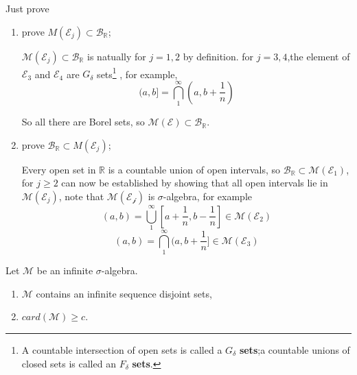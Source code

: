 \begin{mdframed}[backgroundcolor=gray!10,linewidth=0pt]
    \begin{pf} Just prove 
        \begin{enumerate}
            \item prove $M(\mathcal{E}_j)\subset \mathcal{B}_{\mathbb{R}}$;
            
            $\mathcal{M}(\mathcal{E}_j)\subset \mathcal{B}_{\mathbb{R}}$ is natually for $j=1,2$ by definition. for $j=3,4$,the element of $\mathcal{E}_3$ and $\mathcal{E}_4$ are $G_\delta$ sets\footnote{A countable intersection of open sets is called a $G_\delta$ \textbf{sets};a countable unions of closed sets is called an $F_\delta$ \textbf{sets}.}
            , for example, 
            \begin{equation}
                (a,b]=\bigcap^\infty_1(a,b+\frac{1}{n})
            \end{equation}

            So all there are Borel sets, so $\mathcal{\mathcal{M}(\mathcal{E})}\subset \mathcal{B}_{\mathbb{R}}$.

            \item prove $\mathcal{B}_{\mathbb{R}}\subset M(\mathcal{E}_j)$;
            
            Every open set in $\mathbb{R}$ is a countable union of open intervals, so $\mathcal{B}_{\mathbb{R}}\subset \mathcal{M}(\mathcal{E}_1)$, for $j\geqslant 2$ can now be established by showing that all
            open intervals lie in $\mathcal{M}(\mathcal{E}_j)$, note that $\mathcal{M}(\mathcal{E_j})$ is $\sigma$-algebra, for example
            \begin{equation}
                (a,b)=\bigcup^\infty_1[a+\frac{1}{n},b-\frac{1}{n}]\in \mathcal{M}(\mathcal{E}_2)
            \end{equation}
            \begin{equation}
                (a,b)=\bigcap^\infty_1(a,b+\frac{1}{n}]\in \mathcal{M}(\mathcal{E}_3)
            \end{equation}
        \end{enumerate}
    \end{pf}
\end{mdframed}


\begin{question}
    Let $\mathcal{M}$ be an infinite $\sigma$-algebra.
    \begin{enumerate}[itemindent=2em]
        \item $\mathcal{M}$ contains an infinite sequence disjoint sets,
        \item $card(\mathcal{M})\geqslant c$.
    \end{enumerate}
\end{question}

